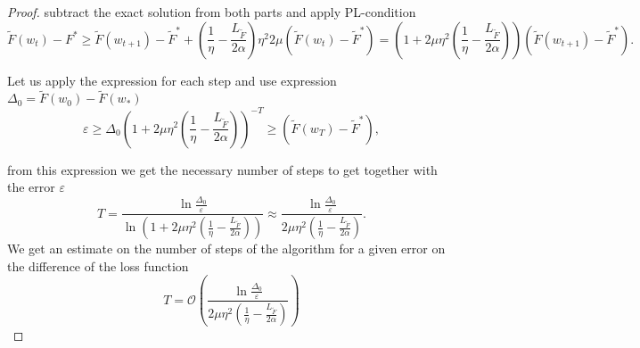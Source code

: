 \documentclass[USenglish]{article}
\theoremstyle{dgthm}
\theoremstyle{dgdef}
\begin{document}
\begin{proof}
    subtract the exact solution from both parts and apply PL-condition
    \begin{equation*}
    \tilde{F}(w_{t}) -  F^* \ge \tilde{F}(w_{t+1}) - \tilde{F}^* + \left(\frac{1}{\eta} - \frac{L_{\tilde{F}}}{2 \alpha} \right) \eta^2 2 \mu (\tilde{F}(w_t) - \tilde{F}^*) = \left( 1 +  2 \mu \eta^2 \left(\frac{1}{\eta} - \frac{L_{\tilde{F}}}{2 \alpha} \right) \right) (\tilde{F}(w_{t+1}) - \tilde{F}^*).
    \end{equation*}

    Let us apply the expression for each step and use expression $\Delta_0 = \tilde{F}(w_0) - \tilde{F}(w_{*})$
    \begin{equation*}
    \varepsilon \ge \Delta_0 \left( 1 +  2 \mu \eta^2 \left(\frac{1}{\eta} - \frac{L_{\tilde{F}}}{2 \alpha} \right) \right)^{-T} \ge (\tilde{F}(w_{T}) - \tilde{F}^*),   
    \end{equation*}
    
    from this expression we get the necessary number of steps to get together with the error $\varepsilon$
    \begin{equation*}
    T = \frac{\ln \frac{\Delta_0}{\varepsilon}}{\ln{\left(1 + 2 \mu \eta^2 \left(\frac{1}{\eta} - \frac{L_{\tilde{F}}}{2 \alpha} \right) \right)}} \approx \frac{\ln \frac{\Delta_0}{\varepsilon}}{2 \mu \eta^2 \left( \frac{1}{\eta} - \frac{L_{\tilde{F}}}{2 \alpha}\right)}.
    \end{equation*}
    We get an estimate on the number of steps of the algorithm for a given error on the difference of the loss function
    \begin{equation*}
    T =  \mathcal{O}\left( \frac{\ln \frac{\Delta_0}{\varepsilon}}{2 \mu \eta^2(\frac{1}{\eta} - \frac{L_{\tilde{F}}}{2 \alpha})} \right)
    \end{equation*}
\end{proof}
\end{document}
